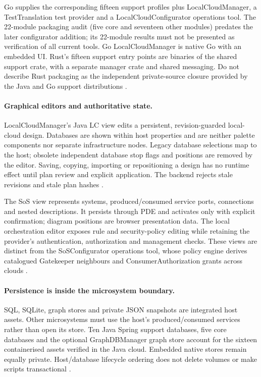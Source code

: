 \documentclass[a4paper]{arrowhead}
\begin{document}
Go supplies the corresponding fifteen support profiles plus LocalCloudManager,
a TestTranslation test provider and a LocalCloudConfigurator operations tool.
The 22-module packaging audit (five core and seventeen other modules) predates
the later configurator addition;
its 22-module results must not be presented as verification of all current tools.
Go LocalCloudManager is native Go with an embedded UI. Rust's fifteen support
entry points are binaries of the shared support crate, with a separate manager
crate and shared messaging. Do not describe Rust packaging as the independent
private-source closure provided by the Java and Go support distributions
\cite{javaPackaging20261025,goPackaging20261028,rustPackaging20261028}.

\paragraph{Graphical editors and authoritative state.}
LocalCloudManager's Java LC view edits a persistent, revision-guarded local-cloud
design. Databases are shown within host properties and are neither palette
components nor separate infrastructure nodes. Legacy database selections map to
the host; obsolete independent database stop flags and positions are removed by
the editor. Saving, copying, importing or repositioning a design has no runtime
effect until plan review and explicit application. The backend rejects stale
revisions and stale plan hashes \cite{javaDatabaseAssets20261030}.

The SoS view represents systems, produced/consumed service ports, connections and
nested descriptions. It persists through PDE and activates only with explicit
confirmation; diagram positions are browser presentation data. The local
orchestration editor exposes rule and security-policy editing while retaining
the provider's authentication, authorization and management checks. These views
are distinct from the SoSConfigurator operations tool, whose policy engine derives
catalogued Gatekeeper neighbours and ConsumerAuthorization grants across clouds
\cite{javaSoS20261030}.

\paragraph{Persistence is inside the microsystem boundary.}
SQL, SQLite, graph stores and private JSON snapshots are integrated host assets.
Other microsystems must use the host's produced/consumed services rather than
open its store. Ten Java Spring support databases, five core databases and the
optional GraphDBManager graph store account for the sixteen containerised assets
verified in the Java cloud. Embedded native stores remain equally private.
Host/database lifecycle ordering does not delete volumes or make scripts
transactional \cite{javaDatabaseAssets20261030}.
\end{document}
